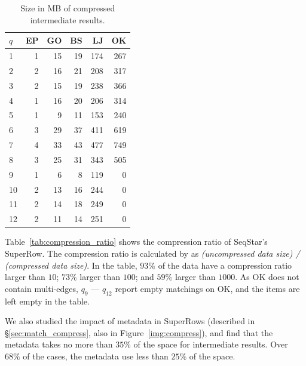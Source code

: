 \begin{table}
  \caption{Size in MB of compressed intermediate results.}\label{tab:compressed}
  \begin{tabular}{lrrrrr}
    \toprule
    $q$ &  EP &  GO &  BS &  LJ &  OK \\
    \midrule
    1  &   1 &  15 &  19 & 174 & 267 \\
    2  &   2 &  16 &  21 & 208 & 317 \\
    3  &   2 &  15 &  19 & 238 & 366 \\
    4  &   1 &  16 &  20 & 206 & 314 \\
    5  &   1 &   9 &  11 & 153 & 240 \\
    6  &   3 &  29 &  37 & 411 & 619 \\
    7  &   4 &  33 &  43 & 477 & 749 \\
    8  &   3 &  25 &  31 & 343 & 505 \\
    9  &   1 &   6 &   8 & 119 & 0 \\
    10 &   2 &  13 &  16 & 244 & 0 \\
    11 &   2 &  14 &  18 & 249 & 0 \\
    12 &   2 &  11 &  14 & 251 & 0 \\
    \bottomrule
  \end{tabular}
\end{table}

Table~\ref{tab:compression_ratio} shows the compression ratio of SeqStar's SuperRow.
The compression ratio is calculated by as \emph{(uncompressed data size) / (compressed data size)}.
In the table, $93\%$ of the data have a compression ratio larger than $10$;
$73\%$ larger than $100$; and $59\%$ larger than $1000$.
As OK does not contain multi-edges, $q_9$ --- $q_{12}$ report empty matchings on OK,
and the items are left empty in the table.

We also studied the impact of metadata in SuperRows (described in \S\ref{sec:match_compress}, also in Figure~\ref{img:compress}),
and find that the metadata takes no more than $35\%$ of the space for intermediate results.
Over $68\%$ of the cases, the metadata use less than $25\%$ of the space.

